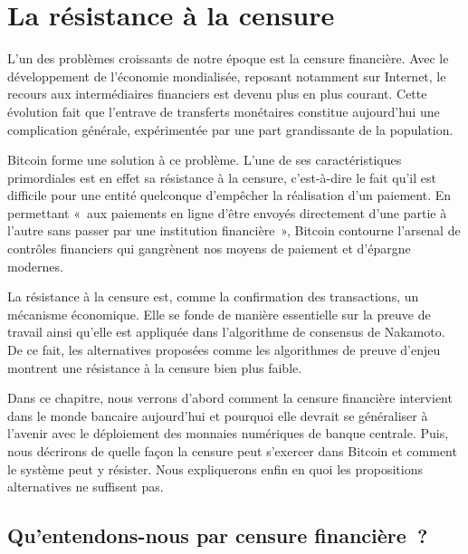 
\chapter{La résistance à la censure}
\label{ch:censure}

L'un des problèmes croissants de notre époque est la censure financière. Avec le développement de l'économie mondialisée, reposant notamment sur Internet, le recours aux intermédiaires financiers est devenu plus en plus courant. Cette évolution fait que l'entrave de transferts monétaires constitue aujourd'hui une complication générale, expérimentée par une part grandissante de la population.

Bitcoin forme une solution à ce problème. L'une de ses caractéristiques primordiales est en effet sa résistance à la censure, c'est-à-dire le fait qu'il est difficile pour une entité quelconque d'empêcher la réalisation d'un paiement. En permettant «~aux paiements en ligne d'être envoyés directement d'une partie à l'autre sans passer par une institution financière~», Bitcoin contourne l'arsenal de contrôles financiers qui gangrènent nos moyens de paiement et d'épargne modernes.

La résistance à la censure est, comme la confirmation des transactions, un mécanisme économique. Elle se fonde de manière essentielle sur la preuve de travail ainsi qu'elle est appliquée dans l'algorithme de consensus de Nakamoto. De ce fait, les alternatives proposées comme les algorithmes de preuve d'enjeu montrent une résistance à la censure bien plus faible.

Dans ce chapitre, nous verrons d'abord comment la censure financière intervient dans le monde bancaire aujourd'hui et pourquoi elle devrait se généraliser à l'avenir avec le déploiement des monnaies numériques de banque centrale. Puis, nous décrirons de quelle façon la censure peut s'exercer dans Bitcoin et comment le système peut y résister. Nous expliquerons enfin en quoi les propositions alternatives ne suffisent pas.

\section*{Qu'entendons-nous par censure financière~?}

%

